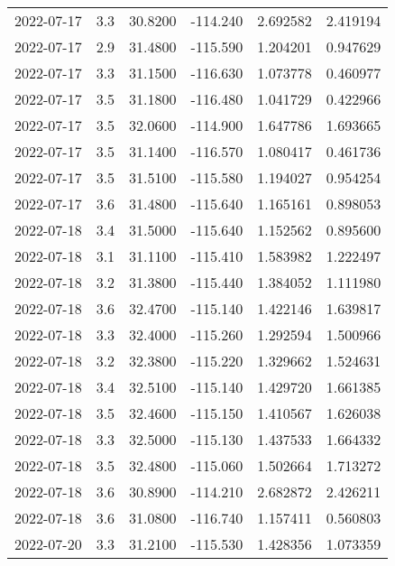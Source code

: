 \begin{tabular}{lrrrrr}
2022-07-17 &       3.3 &  30.8200 &  -114.240 &         2.692582 &         2.419194 \\
2022-07-17 &       2.9 &  31.4800 &  -115.590 &         1.204201 &         0.947629 \\
2022-07-17 &       3.3 &  31.1500 &  -116.630 &         1.073778 &         0.460977 \\
2022-07-17 &       3.5 &  31.1800 &  -116.480 &         1.041729 &         0.422966 \\
2022-07-17 &       3.5 &  32.0600 &  -114.900 &         1.647786 &         1.693665 \\
2022-07-17 &       3.5 &  31.1400 &  -116.570 &         1.080417 &         0.461736 \\
2022-07-17 &       3.5 &  31.5100 &  -115.580 &         1.194027 &         0.954254 \\
2022-07-17 &       3.6 &  31.4800 &  -115.640 &         1.165161 &         0.898053 \\
2022-07-18 &       3.4 &  31.5000 &  -115.640 &         1.152562 &         0.895600 \\
2022-07-18 &       3.1 &  31.1100 &  -115.410 &         1.583982 &         1.222497 \\
2022-07-18 &       3.2 &  31.3800 &  -115.440 &         1.384052 &         1.111980 \\
2022-07-18 &       3.6 &  32.4700 &  -115.140 &         1.422146 &         1.639817 \\
2022-07-18 &       3.3 &  32.4000 &  -115.260 &         1.292594 &         1.500966 \\
2022-07-18 &       3.2 &  32.3800 &  -115.220 &         1.329662 &         1.524631 \\
2022-07-18 &       3.4 &  32.5100 &  -115.140 &         1.429720 &         1.661385 \\
2022-07-18 &       3.5 &  32.4600 &  -115.150 &         1.410567 &         1.626038 \\
2022-07-18 &       3.3 &  32.5000 &  -115.130 &         1.437533 &         1.664332 \\
2022-07-18 &       3.5 &  32.4800 &  -115.060 &         1.502664 &         1.713272 \\
2022-07-18 &       3.6 &  30.8900 &  -114.210 &         2.682872 &         2.426211 \\
2022-07-18 &       3.6 &  31.0800 &  -116.740 &         1.157411 &         0.560803 \\
2022-07-20 &       3.3 &  31.2100 &  -115.530 &         1.428356 &         1.073359 \\

\end{tabular}
